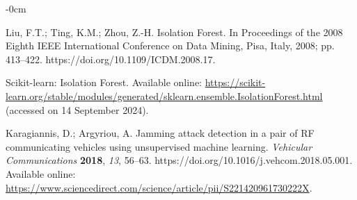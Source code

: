 \documentclass[futureinternet,article,submit,pdftex,moreauthors]{Definitions/mdpi}
\begin{document}
\begin{adjustwidth}{-\extralength}{0cm}
\begin{thebibliography}{999}
Liu, F.T.; Ting, K.M.; Zhou, Z.-H. Isolation Forest. In Proceedings of the 2008 Eighth IEEE International Conference on Data Mining, Pisa, Italy, 2008; pp. 413--422. https://doi.org/10.1109/ICDM.2008.17.

Scikit-learn: Isolation Forest. Available online: \url{https://scikit-learn.org/stable/modules/generated/sklearn.ensemble.IsolationForest.html} (accessed on 14 September 2024).

Karagiannis, D.; Argyriou, A. Jamming attack detection in a pair of RF communicating vehicles using unsupervised machine learning. {\em Vehicular Communications} {\bf 2018}, {\em 13}, 56--63. https://doi.org/10.1016/j.vehcom.2018.05.001. Available online: \url{https://www.sciencedirect.com/science/article/pii/S221420961730222X}.


\end{thebibliography}

%



\PublishersNote{}
\end{adjustwidth}
\end{document}

